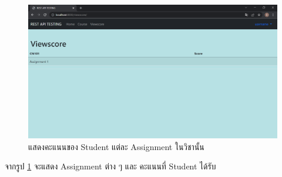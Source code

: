 \begin{figure}[H]
    \captionsetup{justification=centering}
    \centering
    \includegraphics[width=5in]{figures/chapter4/viewscore.PNG}
    \caption{แสดงคะแนนของ Student แต่ละ Assignment ในวิชานั้น}
    \label{figure:score}
\end{figure}
จากรูป \ref{figure:score} จะแสดง Assignment ต่าง ๆ และ คะแนนที่ Student ได้รับ

